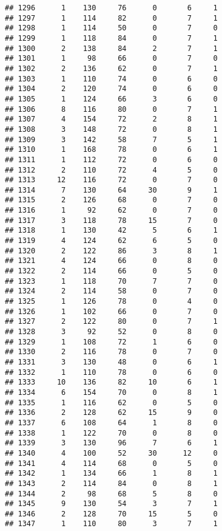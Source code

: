 \documentclass[
]{article}
\begin{document}
\begin{verbatim}
## 1296      1    130     76      0       6     1
## 1297      1    114     82      0       7     1
## 1298      1    114     50      0       7     0
## 1299      1    118     84      0       7     1
## 1300      2    138     84      2       7     1
## 1301      1     98     66      0       7     0
## 1302      2    136     62      0       7     1
## 1303      1    110     74      0       6     0
## 1304      2    120     74      0       6     0
## 1305      1    124     66      3       6     0
## 1306      8    116     80      0       7     1
## 1307      4    154     72      2       8     1
## 1308      3    148     72      0       8     1
## 1309      3    142     58      7       5     1
## 1310      1    168     78      0       6     1
## 1311      1    112     72      0       6     0
## 1312      2    110     72      4       5     0
## 1313     12    116     72      0       7     0
## 1314      7    130     64     30       9     1
## 1315      2    126     68      0       7     0
## 1316      1     92     62      0       7     0
## 1317      3    118     78     15       7     0
## 1318      1    130     42      5       6     1
## 1319      4    124     62      6       5     0
## 1320      2    122     86      3       8     1
## 1321      4    124     66      0       8     0
## 1322      2    114     66      0       5     0
## 1323      1    118     70      7       7     0
## 1324      2    114     58      0       7     0
## 1325      1    126     78      0       4     0
## 1326      1    102     66      0       7     0
## 1327      2    122     80      0       7     1
## 1328      3     92     52      0       8     0
## 1329      1    108     72      1       6     0
## 1330      2    116     78      0       7     0
## 1331      3    130     48      0       6     1
## 1332      1    110     78      0       6     0
## 1333     10    136     82     10       6     1
## 1334      6    154     70      0       8     1
## 1335      1    116     62      0       5     0
## 1336      2    128     62     15       9     0
## 1337      6    108     64      1       8     0
## 1338      1    122     70      0       8     0
## 1339      3    130     96      7       6     1
## 1340      4    100     52     30      12     0
## 1341      4    114     68      0       5     0
## 1342      1    134     66      1       8     1
## 1343      2    114     84      0       8     1
## 1344      2     98     68      5       8     0
## 1345      9    130     54      3       7     1
## 1346      2    128     70     15       5     0
## 1347      1    110     80      3       7     1

\end{verbatim}
\end{document}
